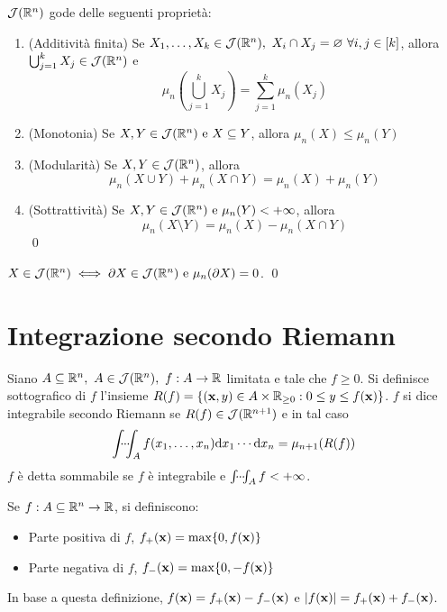 \begin{theorem}
    [Proprietà di $\J(\R^n)$]
    $\J(\R^n)$ gode delle seguenti proprietà:
    \begin{enumerate}
        \item (Additività finita) Se $X_1,\dots,X_k \in \mathcal{J}(\mathbb{R}^n), \ X_i \cap X_j = \varnothing \ \forall i, j \in [k]$, allora $\bigcup_{j=1}^kX_j \in \mathcal{J}(\mathbb{R}^n)$ e
        $$
            \mu_n\left(\bigcup_{j=1}^kX_j\right) = \sum_{j=1}^k\mu_n(X_j)
        $$
        \item (Monotonia) Se $X, Y \in \mathcal{J}(\mathbb{R}^n) \text{ e } X \subseteq Y$, allora $\mu_n(X) \leq \mu_n(Y)$
        \item (Modularità) Se $X, Y \in \mathcal{J}(\mathbb{R}^n)$, allora
        $$
            \mu_n(X \cup Y) + \mu_n (X \cap Y) = \mu_n(X) + \mu_n(Y)
        $$
        \item (Sottrattività) Se $X, Y \in \mathcal{J}(\mathbb{R}^n) \text{ e } \mu_n(Y) < + \infty$, allora
        $$
            \mu_n(X \setminus Y) = \mu_n(X) - \mu_n(X \cap Y)
        $$
        \qed
    \end{enumerate}
\end{theorem}

\begin{lemma}
    $X \in \mathcal{J}(\mathbb{R}^n) \iff \partial X \in \mathcal{J}(\mathbb{R}^n) \text{ e } \mu_n(\partial X)=0$.
    \qed
\end{lemma}

\section{Integrazione secondo Riemann}

\begin{definition}
    Siano $A \subseteq \mathbb{R}^n, \ A \in \mathcal{J}(\mathbb{R}^n), \ f: A \to \mathbb{R}$ limitata e tale che $f \geq 0$. Si definisce sottografico di $f$ l'insieme $R(f)=\{(\vb{x}, y)\in A \times \mathbb{R}_{\geq 0} : 0 \leq y \leq f(\vb{x})\}$.
    $f$ si dice integrabile secondo Riemann se $R(f) \in \mathcal{J}(\mathbb{R}^{n+1})$ e in tal caso
    $$
        \idotsint_A f(x_1,\dots,x_n)\dd x_1\cdots \dd x_n=\mu_{n+1}(R(f))
    $$
    $f$ è detta sommabile se $f$ è integrabile e $\idotsint_Af < +\infty$.
\end{definition}

\begin{definition}
    Se $f:A \subseteq \mathbb{R}^n \to \mathbb{R}$, si definiscono:
    \begin{itemize}
        \item Parte positiva di $f$, $f_+(\vb{x})=\max\{0,f(\vb{x})\}$
        \item Parte negativa di $f$, $f_-(\vb{x})=\max\{0,-f(\vb{x})\}$
    \end{itemize}
    In base a questa definizione, $f(\vb{x})=f_+(\vb{x})-f_-(\vb{x})$ e $\abs{f(\vb{x})}=f_+(\vb{x})+f_-(\vb{x})$.
\end{definition}

